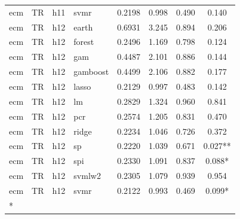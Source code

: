 \begin{ThreePartTable}
\begin{longtable}[t]{llclcccc}
ecm & TR & h11 & svmr & 0.2198 & 0.998 & 0.490 & 0.140\\
\addlinespace
ecm & TR & h12 & earth & 0.6931 & 3.245 & 0.894 & 0.206\\
ecm & TR & h12 & forest & 0.2496 & 1.169 & 0.798 & 0.124\\
ecm & TR & h12 & gam & 0.4487 & 2.101 & 0.886 & 0.144\\
ecm & TR & h12 & gamboost & 0.4499 & 2.106 & 0.882 & 0.177\\
ecm & TR & h12 & lasso & 0.2129 & 0.997 & 0.483 & 0.142\\
ecm & TR & h12 & lm & 0.2829 & 1.324 & 0.960 & 0.841\\
ecm & TR & h12 & pcr & 0.2574 & 1.205 & 0.831 & 0.470\\
ecm & TR & h12 & ridge & 0.2234 & 1.046 & 0.726 & 0.372\\
ecm & TR & h12 & sp & 0.2220 & 1.039 & 0.671 & 0.027**\\
ecm & TR & h12 & spi & 0.2330 & 1.091 & 0.837 & 0.088*\\
ecm & TR & h12 & svmlw2 & 0.2305 & 1.079 & 0.939 & 0.954\\
ecm & TR & h12 & svmr & 0.2122 & 0.993 & 0.469 & 0.099*\\*
\end{longtable}
\end{ThreePartTable}
\endgroup{}
